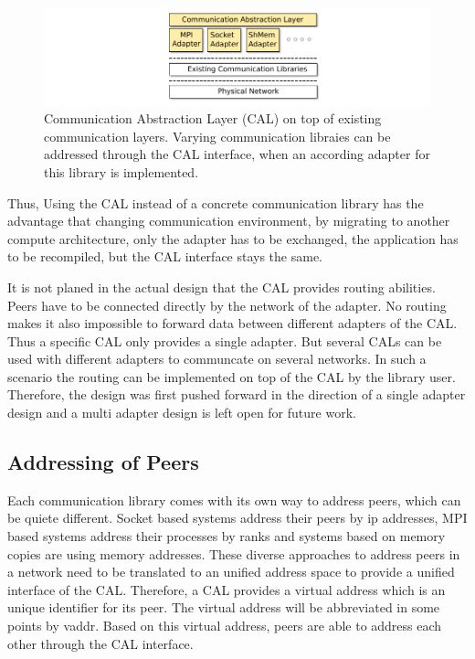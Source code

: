 \begin{figure}[H]
  \centering
  \includegraphics[width=\textwidth]{graphics/30_design_cal}
  \caption{Communication Abstraction Layer (CAL) on top of existing
    communication layers. Varying communication libraies can be
    addressed through the CAL interface, when an according adapter for
    this library is implemented.}
  \label{fig:cal}
\end{figure}

Thus, Using the CAL instead of a concrete communication library has
the advantage that changing communication environment, by migrating to
another compute architecture, only the adapter has to be exchanged,
the application has to be recompiled, but the CAL interface stays the
same.

It is not planed in the actual design that the CAL provides routing
abilities. Peers have to be connected directly by the network of the
adapter. No routing makes it also impossible to forward data between
different adapters of the CAL. Thus a specific CAL only provides a
single adapter. But several CALs can be used with different adapters
to communcate on several networks. In such a scenario the routing can
be implemented on top of the CAL by the library user. Therefore, the
design was first pushed forward in the direction of a single adapter
design and a multi adapter design is left open for future work.


\subsection{Addressing of Peers}
Each communication library comes with its own way to address peers,
which can be quiete different. Socket based systems address their
peers by ip addresses, MPI based systems address their processes by
ranks and systems based on memory copies are using memory addresses.
These diverse approaches to address peers in a network need to be
translated to an unified address space to provide a unified interface of the CAL.
Therefore, a CAL provides a virtual address which is an unique
identifier for its peer. The virtual address
will be abbreviated in some points by vaddr. Based on this virtual
address, peers are able to address each other through the CAL
interface.

